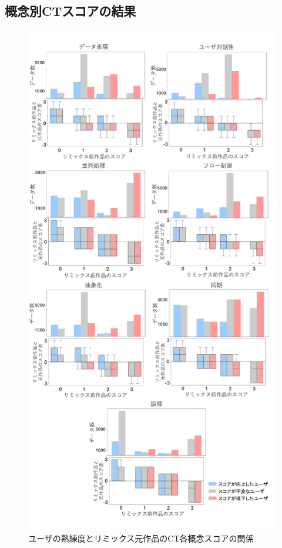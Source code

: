 \documentclass[submit,techrep,noauthor]{ipsj}
\begin{document}


\subsection{概念別CTスコアの結果}

\begin{figure}[t]
  \centering
  \includegraphics[width=\linewidth]{@IPSJ_SIGSE202511_Horio/fig/preAnalysis2.pdf}
  \caption{ユーザの熟練度とリミックス元作品のCT各概念スコアの関係}
  \label{preAnalysis2}
\end{figure}
\end{document}
